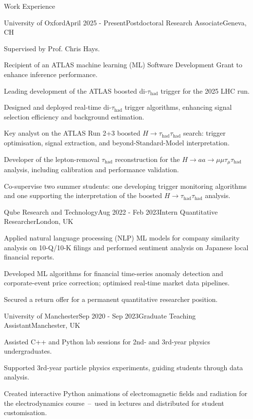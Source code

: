\documentclass[11pt]{resume} %
\begin{document}
    \nocite{*}

    \begin{rSection}{Work Experience}
        \begin{rSubsection}{University of Oxford}{April 2025 - Present}{Postdoctoral Research Associate}{Geneva, CH}
            \item Supervised by Prof. Chris Hays.
            \item Recipient of an ATLAS machine learning (ML) Software Development Grant to enhance inference performance.
            \item Leading development of the ATLAS boosted di-\(\tau_{\mathrm{had}}\) trigger for the 2025 LHC run.
            \item Designed and deployed real-time di-\(\tau_{\mathrm{had}}\) trigger algorithms, enhancing signal selection efficiency and background estimation.
            \item Key analyst on the ATLAS Run 2+3 boosted \(H\to\tau_{\mathrm{had}}\tau_{\mathrm{had}}\) search: trigger optimisation, signal extraction, and beyond-Standard-Model interpretation.
            \item Developer of the lepton-removal \(\tau_{\mathrm{had}}\) reconstruction for the \(H\to aa\to\mu\mu\tau_{\mu}\tau_{\mathrm{had}}\) analysis, including calibration and performance validation.
            \item Co-supervise two summer students: one developing trigger monitoring algorithms and one supporting the interpretation of the boosted \(H\to\tau_{\mathrm{had}}\tau_{\mathrm{had}}\) analysis.
        \end{rSubsection}
        \begin{rSubsection}{Qube Research and Technology}{Aug 2022 - Feb 2023}{Intern Quantitative Researcher}{London, UK}
            \item Applied natural language processing (NLP) ML models for company similarity analysis on 10-Q/10-K filings and performed sentiment analysis on Japanese local financial reports.
            \item Developed ML algorithms for financial time-series anomaly detection and corporate-event price correction; optimised real-time market data pipelines.
            \item Secured a return offer for a permanent quantitative researcher position.
        \end{rSubsection}
        \begin{rSubsection}{University of Manchester}{Sep 2020 - Sep 2023}{Graduate Teaching Assistant}{Manchester, UK}
            \item Assisted C++ and Python lab sessions for 2nd- and 3rd-year physics undergraduates.
            \item Supported 3rd-year particle physics experiments, guiding students through data analysis.
            \item Created interactive Python animations of electromagnetic fields and radiation for the electrodynamics course~--~used in lectures and distributed for student customisation.
        \end{rSubsection}
    \end{rSection}
\end{document}
